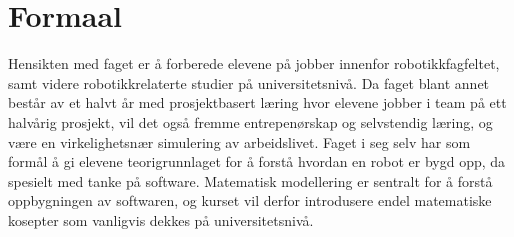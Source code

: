 \section*{Formaal} \label{Sec: Formaal}


	Hensikten med faget er å forberede elevene på jobber innenfor robotikkfagfeltet, samt videre robotikkrelaterte studier på universitetsnivå. Da faget blant annet består av et halvt år med prosjektbasert læring hvor elevene jobber i team på ett halvårig prosjekt, vil det også fremme entrepenørskap og selvstendig læring, og være en virkelighetsnær simulering av arbeidslivet.
	Faget i seg selv har som formål å gi elevene teorigrunnlaget for å forstå hvordan en robot er bygd opp, da spesielt med tanke på software. Matematisk modellering er sentralt for å forstå oppbygningen av softwaren, og kurset vil derfor introdusere endel matematiske kosepter som vanligvis dekkes på universitetsnivå.
